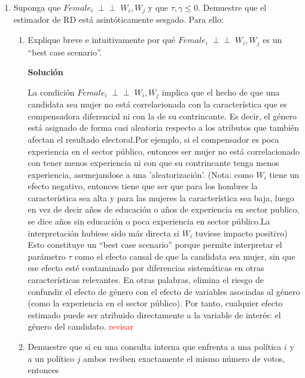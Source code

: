 \documentclass[a4paper, answers, addpoints, 11pt]{exam}
\newcommand{\indep}{\mathrel{\perp\!\!\!\perp}}
\newenvironment{solucion}{%
  \begin{mdframed}[
    backgroundcolor=blue!5,    %
    linecolor=blue!50,          %
    linewidth=2pt,              %
    leftmargin=10pt,            %
    rightmargin=8pt,           %
    topline=true,              %
    bottomline=true,            %
    roundcorner=10pt,           %
    innerleftmargin=10pt,       %
    innerrightmargin=10pt,      %
    innerbottommargin=10pt,     %
    innertopmargin=10pt         %
  ]%
  \begin{tcolorbox}[colframe=blue!50!black, colback=blue!50, coltitle=white, sharp corners=all, boxrule=1mm, width=\textwidth, halign=left, valign=center, top=0mm, bottom=0mm, left=0mm, right=0mm] \textbf{Solución} \end{tcolorbox} }{\end{mdframed}}
\begin{document}
\bigskip

\begin{enumerate}[resume]
    \item Suponga que $Female_i \; \perp\!\!\!\perp \; W_i, W_j$ y que $\tau,\gamma \leq 0$. Demuestre que el estimador de RD está asintóticamente sesgado. Para ello:

    \begin{enumerate}

        \item Explique breve e intuitivamente por qué $Female_i \; \indep \; W_i, W_j$ es un ``best case scenario''.
       \begin{solucion}
La condición $Female_i \; \indep \; W_i, W_j$ implica que el hecho de que una candidata sea mujer no está correlacionada con la característica que es compensadora diferencial ni con la de su contrincante. Es decir, el género está asignado de forma casi aleatoria respecto a los atributos que también afectan el resultado electoral.Por ejemplo, si el compensador es poca experiencia en el sector público, entonces ser mujer no está correlacionado con tener menos experiencia ni con que su contrincante tenga menos experiencia, asemejandose a una 'aleatorización'. (Nota: como $W_i$ tiene un efecto negativo, entonces tiene que ser que para los hombres la característica sea alta y para las mujeres la característica sea baja, luego en vez de decir años de educación o años de experiencia en sector publico, se dice años sin educación o poca experiencia en sector público.La interpretación hubiese sido más directa si $W_i$ tuviese impacto positivo)\\

Esto constituye un ``best case scenario'' porque permite interpretar el parámetro $\tau$ como el efecto causal de que la candidata sea mujer, sin que ese efecto esté contaminado por diferencias sistemáticas en otras características relevantes. En otras palabras, elimina el riesgo de confundir el efecto de género con el efecto de variables asociadas al género (como la experiencia en el sector público). Por tanto, cualquier efecto estimado puede ser atribuido directamente a la variable de interés: el género del candidato. 
\textcolor{red}{revisar}
\end{solucion}
            
        \item Demuestre que si en una consulta interna que enfrenta a una política $i$ y a un político $j$ ambos reciben exactamente el mismo número de votos, entonces


\end{enumerate}
\end{enumerate}
\end{document}
